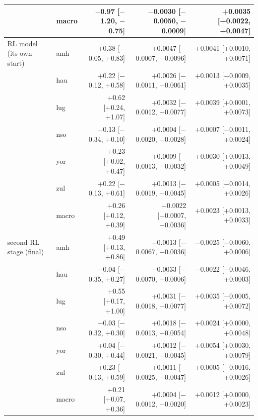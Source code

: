{\begin{longtable}{@{}llrrr@{}}
 & macro & $-$0.97 [$-$1.20, $-$0.75] & $-$0.0030 [$-$0.0050, $-$0.0009] & +0.0035 [+0.0022, +0.0047] \\
\midrule
RL model (its own start) & amh & +0.38 [$-$0.05, +0.83] & +0.0047 [$-$0.0007, +0.0096] & +0.0041 [+0.0010, +0.0071] \\
 & hau & +0.22 [$-$0.12, +0.58] & +0.0026 [$-$0.0011, +0.0061] & +0.0013 [$-$0.0009, +0.0035] \\
 & lug & +0.62 [+0.24, +1.07] & +0.0032 [$-$0.0012, +0.0077] & +0.0039 [+0.0001, +0.0073] \\
 & nso & $-$0.13 [$-$0.34, +0.10] & +0.0004 [$-$0.0020, +0.0028] & +0.0007 [$-$0.0011, +0.0024] \\
 & yor & +0.23 [+0.02, +0.47] & +0.0009 [$-$0.0013, +0.0032] & +0.0030 [+0.0013, +0.0049] \\
 & zul & +0.22 [$-$0.13, +0.61] & +0.0013 [$-$0.0019, +0.0045] & +0.0005 [$-$0.0014, +0.0026] \\
 & macro & +0.26 [+0.12, +0.39] & +0.0022 [+0.0007, +0.0036] & +0.0023 [+0.0013, +0.0033] \\
\midrule
second RL stage (final) & amh & +0.49 [+0.13, +0.86] & $-$0.0013 [$-$0.0067, +0.0036] & $-$0.0025 [$-$0.0060, +0.0006] \\
 & hau & $-$0.04 [$-$0.35, +0.27] & $-$0.0033 [$-$0.0070, +0.0006] & $-$0.0022 [$-$0.0046, +0.0003] \\
 & lug & +0.55 [+0.17, +1.00] & +0.0031 [$-$0.0018, +0.0077] & +0.0035 [$-$0.0005, +0.0072] \\
 & nso & $-$0.03 [$-$0.32, +0.30] & +0.0018 [$-$0.0013, +0.0054] & +0.0024 [+0.0000, +0.0048] \\
 & yor & +0.04 [$-$0.30, +0.44] & +0.0012 [$-$0.0021, +0.0045] & +0.0054 [+0.0030, +0.0079] \\
 & zul & +0.23 [$-$0.13, +0.59] & +0.0011 [$-$0.0025, +0.0047] & +0.0005 [$-$0.0016, +0.0026] \\
 & macro & +0.21 [+0.07, +0.36] & +0.0004 [$-$0.0012, +0.0020] & +0.0012 [+0.0000, +0.0023] \\
\midrule
\end{longtable}}
